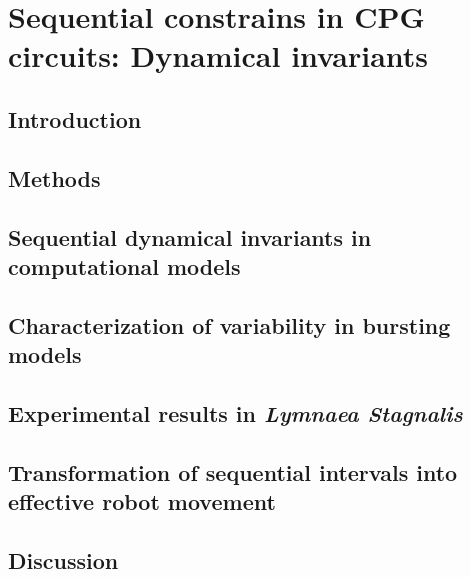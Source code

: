 \chapter{Sequential constrains in CPG circuits: Dynamical invariants}
\label{c-invariants}
\section{Introduction}

\section{Methods}

\section{Sequential dynamical invariants in computational models}

\section{Characterization of variability in bursting models}
\label{c-invariants-model}
\section{Experimental results in \textit{Lymnaea Stagnalis}}

\section{Transformation of sequential intervals into effective robot movement}

\section{Discussion}
